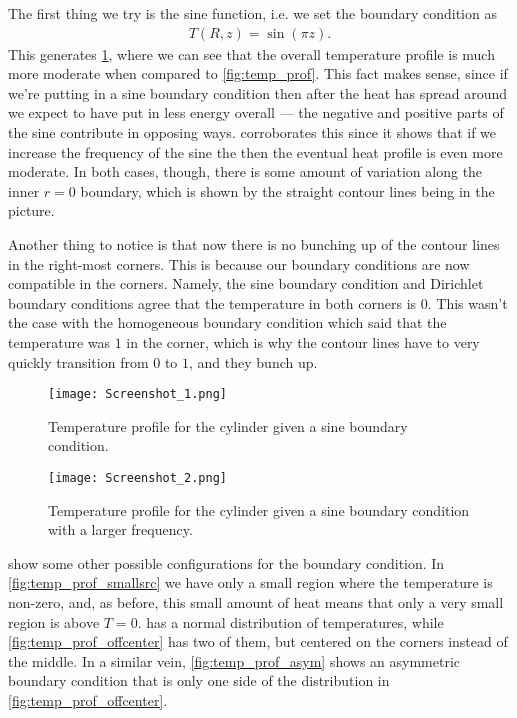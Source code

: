 \documentclass[10pt,a4paper,twocolumn]{article}
\begin{document}
The first thing we try is the sine function, i.e. we set the boundary condition as
%
\begin{align}
    T(R, z) = \sin (\pi z).
\end{align}
%
This generates \cref{fig:temp_prof_1sine}, where we can see that the overall temperature profile is much more moderate when compared to \cref{fig:temp_prof}. This fact makes sense, since if we're putting in a sine boundary condition then after the heat has spread around we expect to have put in less energy overall --- the negative and positive parts of the sine contribute in opposing ways.  corroborates this since it shows that if we increase the frequency of the sine the then the eventual heat profile is even more moderate. In both cases, though, there is some amount of variation along the inner $r=0$ boundary, which is shown by the straight contour lines being in the picture.

Another thing to notice is that now there is no bunching up of the contour lines in the right-most corners. This is because our boundary conditions are now compatible in the corners. Namely, the sine boundary condition and Dirichlet boundary conditions agree that the temperature in both corners is $0$. This wasn't the case with the homogeneous boundary condition which said that the temperature was $1$ in the corner, which is why the contour lines have to very quickly transition from $0$ to $1$, and they bunch up.


\begin{figure}[!t]
    \centering
    \texttt{[image: Screenshot\_1.png]}
    \caption{Temperature profile for the cylinder given a sine boundary condition.}
    \label{fig:temp_prof_1sine}
\end{figure}

\begin{figure}[!t]
    \centering
    \texttt{[image: Screenshot\_2.png]}
    \caption{Temperature profile for the cylinder given a sine boundary condition with a larger frequency.}
    \label{fig:temp_prof_3sine}
\end{figure}

 show some other possible configurations for the boundary condition. In \cref{fig:temp_prof_smallsrc} we have only a small region where the temperature is non-zero, and, as before, this small amount of heat means that only a very small region is above $T=0$.  has a normal distribution of temperatures, while \cref{fig:temp_prof_offcenter} has two of them, but centered on the corners instead of the middle. In a similar vein, \cref{fig:temp_prof_asym} shows an asymmetric boundary condition that is only one side of the distribution in \cref{fig:temp_prof_offcenter}.
\end{document}
